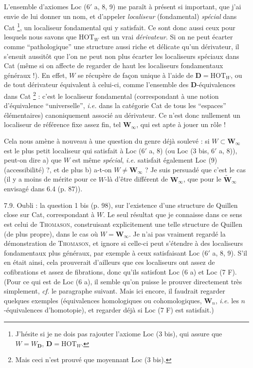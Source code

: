 L'ensemble d'axiomes Loc (6$'$ a, 8, 9) me paraît à présent si important, que j'ai envie de lui donner un nom, et d'appeler \textit{localiseur} (fondamental) \textit{spécial} dans Cat \footnote[57]{J'hésite si je ne dois pas rajouter l'axiome Loc (3 bis), qui assure que $W=W_{\mathbf{D}}$, $\mathbf{D}=\mathrm{HOT}_W$.}, un localiseur fondamental qui y satisfait. Ce sont donc aussi ceux pour lesquels nous savons que $\mathrm{HOT}_W$ est un vrai \textit{dérivateur.} Si on ne peut écarter comme ``pathologique'' une structure aussi riche et délicate qu'un dérivateur, il s'ensuit aussitôt que l'on ne peut non plus écarter les localiseurs spéciaux dans Cat (même si on affecte de regarder de haut les
localiseurs fondamentaux généraux !). En effet, $W$ se récupère de façon unique à l'aide de $\mathbf{D}=\mathrm{HOT}_W$, ou de tout dérivateur équivalent à celui-ci, comme l'ensemble des $\mathbf{D}$-équivalences dans Cat \footnote[58]{Mais ceci n'est prouvé que moyennant Loc (3 bis).} : c'est le localiseur fondamental (correspondant à une notion d'équivalence ``universelle'', \textit{i.e.} dans la catégorie Cat de tous les ``espaces'' élémentaires) canoniquement associé au dérivateur. Ce n'est donc nullement un localiseur de référence fixe assez fin, tel $\mathbf{W}_\infty$, qui est apte à jouer un rôle !

Cela nous amène à nouveau à une question du genre déjà soulevé : si $W\subset\mathbf{W}_\infty$ est le plus petit localiseur qui satisfait à Loc (6$'$ a, 8) (ou Loc (3 bis, 6$'$ a, 8)), peut-on dire a) que $W$ est même \textit{spécial}, \textit{i.e.}
satisfait également Loc (9) (accessibilité) ?, et de plus b) a-t-on $W\neq\mathbf{W}_\infty$ ? Je suis persuadé que c'est le cas (il y a moins de mérite pour ce $W$-là d'être différent de $\mathbf{W}_\infty$,
que pour le $\tilde{\mathbf{W}}_\infty$ envisagé dans 6.4 (p. 87)).

7.9. Oubli : la question 1 bis (p. 98), sur l'existence d'une structure de Quillen close sur Cat, correspondant à $W$. Le seul résultat que je connaisse dans ce sens est celui de \textsc{Thomason}, construisant explicitement une telle structure de Quillen (de plus propre), dans le cas où $W=\mathbf{W}_\infty$. Je n'ai pas vraiment regardé la démonstration de \textsc{Thomason}, et ignore si celle-ci peut s'étendre à des localiseurs fondamentaux plus généraux, par exemple à ceux satisfaisant Loc (6$'$ a, 8, 9). S'il en était ainsi, cela prouverait d'ailleurs que ces localiseurs
ont assez de cofibrations et assez de fibrations, donc qu'ils satisfont Loc (6 a) et Loc (7 F). (Pour ce qui est de Loc (6 a), il semble qu'on puisse le prouver directement très simplement, \textit{cf.} le paragraphe suivant. Mais ici encore, il faudrait regarder quelques exemples (équivalences homologiques ou cohomologiques, $\mathbf{W}_n$, \textit{i.e.} les $n$-équivalences d'homotopie), et regarder déjà si Loc (7 F) est satisfait.)

